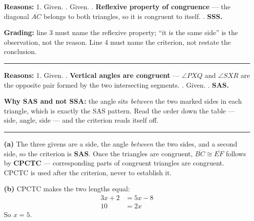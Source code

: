 \documentclass[12pt]{article}
\begin{document}



\textbf{Reasons:} 1. Given. . Given. . \textbf{Reflexive property of congruence} --- the diagonal $\overline{AC}$ belongs to both triangles, so it is congruent to itself. . \textbf{SSS.}

\textbf{Grading:} line 3 must name the reflexive property; ``it is the same side'' is the observation, not the reason. Line 4 must name the criterion, not restate the conclusion.

\vspace{0.2cm}\noindent\rule{\linewidth}{0.2pt}


\textbf{Reasons:} 1. Given. . \textbf{Vertical angles are congruent} --- $\angle PXQ$ and $\angle SXR$ are the opposite pair formed by the two intersecting segments. . Given. . \textbf{SAS.}

\textbf{Why SAS and not SSA:} the angle sits \emph{between} the two marked sides in each triangle, which is exactly the SAS pattern. Read the order down the table --- side, angle, side --- and the criterion reads itself off.

\vspace{0.2cm}\noindent\rule{\linewidth}{0.2pt}


\textbf{(a)} The three givens are a side, the angle \emph{between} the two sides, and a second side, so the criterion is \textbf{SAS}. Once the triangles are congruent, $\overline{BC} \cong \overline{EF}$ follows by \textbf{CPCTC} --- corresponding parts of congruent triangles are congruent. CPCTC is used after the criterion, never to establish it.

\textbf{(b)} CPCTC makes the two lengths equal:
\begin{align*}
  3x + 2 &= 5x - 8 \\
  10 &= 2x
\end{align*}
So $x = 5$. 
\end{document}
